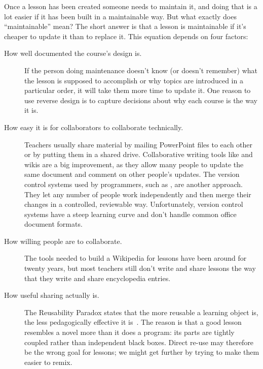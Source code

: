 
Once a lesson has been created someone needs to maintain it,
and doing that is a lot easier if it has been built in a maintainable way.
But what exactly does ``maintainable'' mean?
The short answer is that a lesson is maintainable
if it's cheaper to update it than to replace it.
This equation depends on four factors:

\begin{description}

\item[How well documented the course's design is.]
  If the person doing maintenance doesn't know (or doesn't remember)
  what the lesson is supposed to accomplish
  or why topics are introduced in a particular order,
  it will take them more time to update it.
  One reason to use reverse design
  is to capture decisions about why each course is the way it is.

\item[How easy it is for collaborators to collaborate technically.]
  Teachers usually share material by mailing PowerPoint files to each other
  or by putting them in a shared drive.
  Collaborative writing tools like  and wikis
  are a big improvement,
  as they allow many people to update the same document and comment on other people's updates.
  The version control systems used by programmers,
  such as ,
  are another approach.
  They let any number of people work independently
  and then merge their changes in a controlled, reviewable way.
  Unfortunately,
  version control systems have a steep learning curve
  and don't handle common office document formats.

\item[How willing people are to collaborate.]
  The tools needed to build a Wikipedia for lessons have been around for twenty years,
  but most teachers still don't write and share lessons
  the way that they write and share encyclopedia entries.

\item[How useful sharing actually is.]
  The Reusability Paradox states that the more reusable a learning object is,
  the less pedagogically effective it is~\cite{Wile2002}.
  The reason is that a good lesson resembles a novel more than it does a program:
  its parts are tightly coupled rather than independent black boxes.
  Direct re-use may therefore be the wrong goal for lessons;
  we might get further by trying to make them easier to remix.

\end{description}

